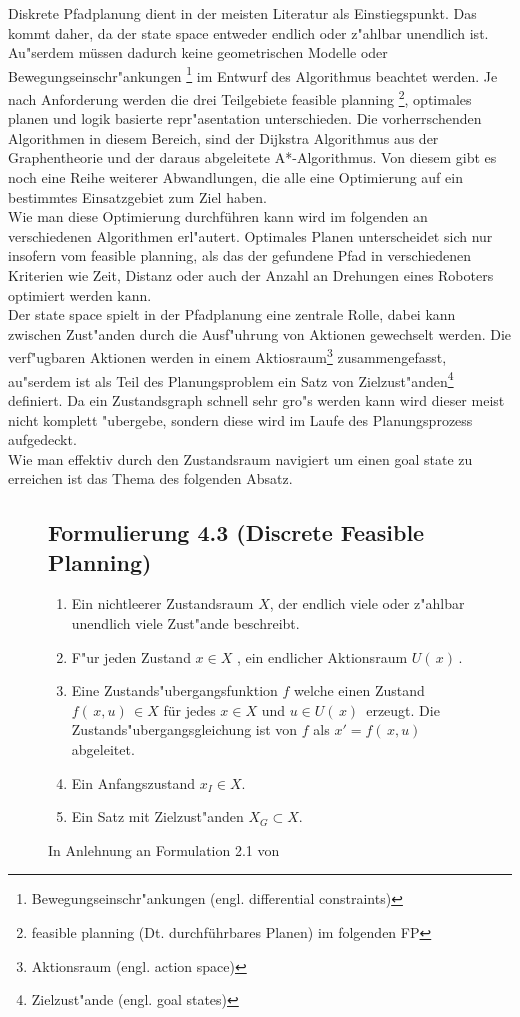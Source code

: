 Diskrete Pfadplanung dient in der meisten Literatur als Einstiegspunkt. Das kommt daher, da der state space entweder endlich oder z"ahlbar unendlich ist.\\
Au"serdem müssen dadurch keine geometrischen Modelle oder Bewegungseinschr"ankungen \footnote{Bewegungseinschr"ankungen (engl. differential constraints)} im Entwurf des Algorithmus beachtet werden.
Je nach Anforderung werden die drei Teilgebiete feasible planning \footnote{feasible planning (Dt. durchführbares Planen) im folgenden FP}, optimales planen und logik basierte repr"asentation unterschieden. Die vorherrschenden Algorithmen in diesem Bereich, sind der Dijkstra Algorithmus aus der Graphentheorie und der daraus abgeleitete A*-Algorithmus. Von diesem gibt es noch eine Reihe weiterer Abwandlungen, die alle eine Optimierung auf ein bestimmtes Einsatzgebiet zum Ziel haben.\cite[~S. 27]{Lav06} \\
Wie man diese Optimierung durchführen kann wird im folgenden an verschiedenen Algorithmen erl"autert. Optimales Planen unterscheidet sich nur insofern vom feasible planning, als das der gefundene Pfad in verschiedenen Kriterien wie Zeit, Distanz oder auch der Anzahl an Drehungen eines Roboters optimiert werden kann.\cite[~S. 43]{Lav06} \\
Der state space spielt in der Pfadplanung eine zentrale Rolle, dabei kann zwischen Zust"anden durch die Ausf"uhrung von Aktionen gewechselt werden. Die verf"ugbaren Aktionen werden in einem Aktiosraum\footnote{Aktionsraum (engl. action space) } zusammengefasst, au"serdem ist als Teil des Planungsproblem ein Satz von Zielzust"anden\footnote{Zielzust"ande (engl. goal states)} definiert. 
Da ein Zustandsgraph schnell sehr gro"s werden kann wird dieser meist nicht komplett "ubergebe, sondern diese wird im Laufe des Planungsprozess aufgedeckt.
\cite[~S. 43]{Lav06} \\
Wie man effektiv durch den Zustandsraum navigiert um einen goal state zu erreichen ist das Thema des folgenden Absatz.
\begin{figure}
\centering
\subsection*{Formulierung 4.3 (Discrete Feasible Planning)}
\begin{enumerate}
	\item Ein nichtleerer Zustandsraum $X$, der endlich viele oder z"ahlbar unendlich viele Zust"ande beschreibt.  
	\item F"ur jeden Zustand $x \in X$ , ein endlicher Aktionsraum $U( \, x) \,$.
	\item Eine Zustands"ubergangsfunktion $f$ welche einen Zustand  $f( \, x,u) \, \in X$ für jedes $x \in X$  und $u \in U( \, x) \,$ erzeugt. Die Zustands"ubergangsgleichung ist von $f$ als $x' = f( \, x,u )\, $ abgeleitet.
	\item Ein Anfangszustand $ x_{I} \in X$.
	\item Ein Satz mit Zielzust"anden $X_{G} \subset X$.
\end{enumerate}
\caption{In Anlehnung an Formulation 2.1 von \cite[~S. 29]{Lav06}}
\label{lav02}
\end{figure}
